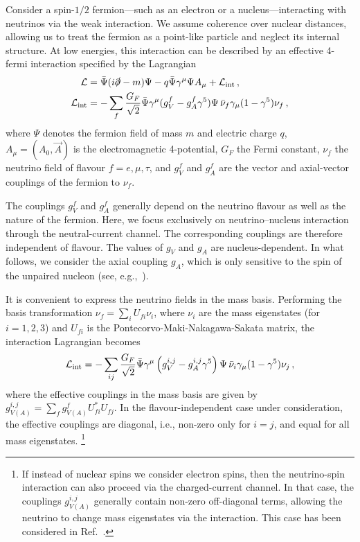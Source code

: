 \documentclass[aps,prd,10pt,twocolumn,superscriptaddress,floatfix,nofootinbib,amsmath,amssymb,altaffilletter,preprintnumbers]{revtex4-1}
\begin{document}
Consider a spin-$1/2$ fermion---such as an electron or a nucleus---interacting with neutrinos via the weak interaction. We assume coherence over nuclear distances, allowing us to treat the fermion as a point-like particle and neglect its internal structure. At low energies, this interaction can be described by an effective 4-fermi interaction specified by the Lagrangian 
\begin{equation}
\begin{aligned}
    {\cal L} &= \bar{\Psi}(i\slashed{\partial} - m)\Psi - q\bar{\Psi}\gamma^\mu \Psi A_\mu  + {\cal L}_{\rm int}\, ,\\
    {\cal L}_{\rm int}&=-\sum_f \frac{G_F}{\sqrt{2}} \bar{\Psi} \gamma^\mu (g^f_V - g^f_A \gamma^5) \Psi \, \bar{\nu}_f \gamma_\mu (1 - \gamma^5) \nu_f \,,
    \label{eq:4fermi}
\end{aligned}
\end{equation}
where $\Psi$ denotes the fermion field of mass $m$ and electric charge $q$, $A_\mu = (A_0, \vec{A})$ is  the electromagnetic 4-potential,  $G_F$ the Fermi constant,  $\nu_f$ the neutrino field of flavour $f = e, \mu, \tau$, and $g_V^f$ and $g_A^f$ are the vector and axial-vector couplings of the fermion to $\nu_f$.

The couplings $g_V^f$ and $g_A^f$ generally depend on the neutrino flavour as well as the nature of the fermion.  Here, we focus exclusively on neutrino–nucleus interaction through the neutral-current channel. The corresponding couplings are therefore independent of flavour. The values of $g_V$ and $g_A$ are nucleus-dependent. In what follows, we consider the axial coupling $g_A$, which is only sensitive to the spin of the unpaired nucleon (see, e.g.,~\cite{bohr1998nuclear}). 

It is convenient to express the neutrino fields in the mass basis.
Performing the basis transformation $\nu_f = \sum_i U_{fi} \nu_i$, where $\nu_i$ are the mass eigenstates (for $i = 1,2,3$) and $U_{fi}$ is the Pontecorvo-Maki-Nakagawa-Sakata matrix, the interaction Lagrangian becomes
\begin{equation}
  \mathcal{L}_{\rm int} = -\sum_{ij} \frac{G_F}{\sqrt{2}} \bar{\Psi} \gamma^\mu \left(g^{i,j}_V - g^{i,j}_A \gamma^5\right) \Psi \, \bar{\nu}_i \gamma_\mu (1 - \gamma^5) \nu_j \,,
  \label{eq:lint2}
\end{equation}
where the effective couplings in the mass basis are given by $g^{i,j}_{V(A)} = \sum_f g_{V(A)}^f U_{fi}^* U_{fj}$. In the flavour-independent case under consideration,
the effective couplings are diagonal, i.e., non-zero only for $i = j$, and equal for all mass eigenstates.%
%
\footnote{If instead of nuclear spins we consider electron spins, then the neutrino-spin interaction can also proceed via the charged-current channel.  In that case, the couplings $g_{V(A)}^{i,j}$ generally contain non-zero off-diagonal terms, allowing the neutrino to change mass eigenstates via the interaction.  This case has been considered in Ref.~\cite{Arvanitaki:2024taq}.}
%
\end{document}
